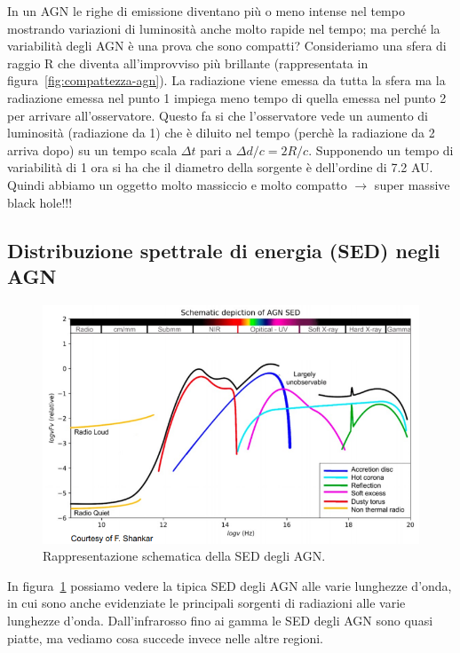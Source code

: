 In un AGN le righe di emissione diventano più o meno intense nel tempo mostrando variazioni di luminosità anche molto rapide nel tempo; ma perché la variabilità degli AGN è una prova che sono compatti? Consideriamo una sfera di raggio R che diventa all’improvviso più brillante (rappresentata in figura~\ref{fig:compattezza-agn}). La radiazione viene emessa da tutta la sfera ma la radiazione emessa nel punto 1 impiega meno tempo di quella emessa nel punto 2 per arrivare all’osservatore. Questo fa si che l’osservatore vede un aumento di luminosità (radiazione da 1) che è diluito nel tempo (perchè la radiazione da 2 arriva dopo) su un tempo scala $\Delta t$ pari a $\Delta d/c = 2R/c$. Supponendo un tempo di variabilità di 1 ora si ha che il diametro della sorgente è dell’ordine di 7.2 AU. Quindi abbiamo un oggetto molto massiccio e molto compatto $\rightarrow$ super massive black hole!!!

\subsection{Distribuzione spettrale di energia (SED) negli AGN}

\begin{figure}
    \centering
    \includegraphics[width = 0.6 \textwidth]{immagini/sed-agn.png}
    \caption{Rappresentazione schematica della SED degli AGN.}
    \label{fig:sed-agn}
\end{figure}
In figura~\ref{fig:sed-agn} possiamo vedere la tipica SED degli AGN alle varie lunghezze d’onda, in cui sono anche evidenziate le principali sorgenti di radiazioni alle varie lunghezze d'onda. Dall’infrarosso fino ai gamma le SED degli AGN sono quasi piatte, ma vediamo cosa succede invece nelle altre regioni.

